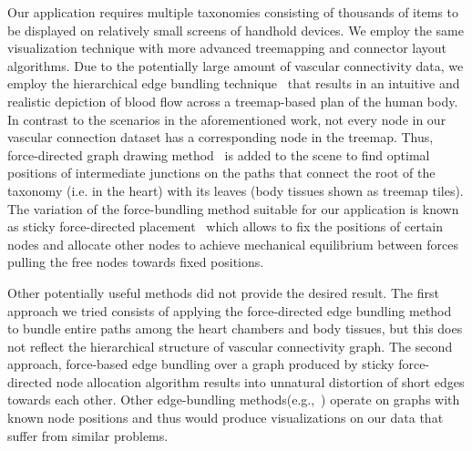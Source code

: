 Our application requires multiple taxonomies consisting of thousands of items to be displayed on
relatively small screens of handhold devices. We employ the same visualization technique with more
advanced treemapping and connector layout algorithms. Due to the potentially large amount of
vascular connectivity data, we employ the hierarchical edge bundling technique~\cite{Hol06} that
results in an intuitive and realistic depiction of blood flow across a treemap-based plan of the
human body. In contrast to the scenarios in the aforementioned work, not every node in our vascular
connection dataset has a corresponding node in the treemap. Thus, force-directed graph drawing
method~\cite{BET+99} is added to the scene to find optimal positions of intermediate junctions on
the paths that connect the root of the taxonomy (i.e. in the heart) with its leaves (body tissues
shown as treemap tiles). The variation of the force-bundling method suitable for our application is
known as sticky force-directed placement~\cite{FR91} which allows to fix the positions of certain
nodes and allocate other nodes to achieve mechanical equilibrium between forces pulling the free
nodes towards fixed positions.

Other potentially useful methods did not provide the desired result. The first approach we tried
consists of applying the force-directed edge bundling method~\cite{HW09} to bundle entire paths
among the heart chambers and body tissues, but this does not reflect the hierarchical structure of
vascular connectivity graph. The second approach, force-based edge bundling over a graph produced
by sticky force-directed node allocation algorithm results into unnatural distortion of short edges
towards each other. Other edge-bundling methods(e.g.,~\cite{GHN+11,HET12,SHH11}) operate on graphs
with known node positions and thus would produce visualizations on our data that suffer from similar
problems.

